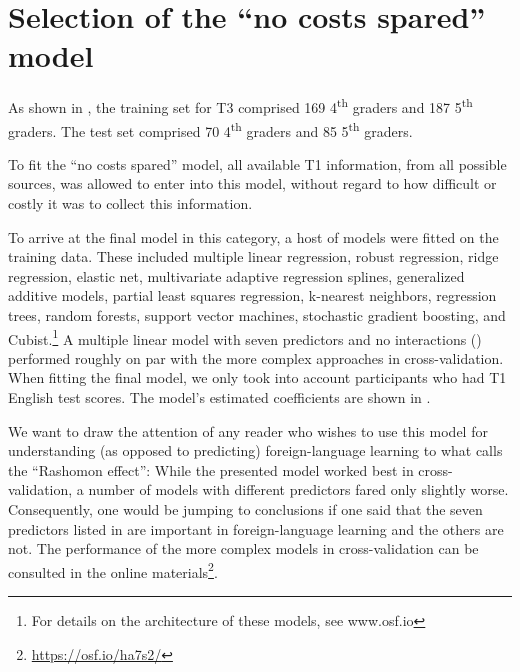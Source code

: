 \documentclass[output=paper]{langsci/langscibook}
\begin{document}
\section{Selection of the ``no costs spared'' model}

As shown in , the training set for T3 comprised 169 4\textsuperscript{th} graders and 187 5\textsuperscript{th} graders. The test set comprised 70 4\textsuperscript{th} graders and 85 5\textsuperscript{th} graders.

To fit the ``no costs spared'' model, all available T1 information, from all possible sources, was allowed to enter into this model, without regard to how difficult or costly it was to collect this information. 

To arrive at the final model in this category, a host of models were fitted on the training data. These included multiple linear regression, robust regression, ridge regression, elastic net, multivariate adaptive regression splines, generalized additive models, partial least squares regression, k-nearest neighbors, regression trees, random forests, support vector machines, stochastic gradient boosting, and Cubist.\footnote{For details on the architecture of these models, see www.osf.io} A multiple linear model with seven predictors and no interactions () performed roughly on par with the more complex approaches in cross-validation. When fitting the final model, we only took into account participants who had T1 English test scores. The model’s estimated coefficients are shown in . 

We want to draw the attention of any reader who wishes to use this model for understanding (as opposed to predicting) foreign-language learning to what \citet{Breiman2001} calls the ``Rashomon effect'': While the presented model worked best in cross-validation, a number of models with different predictors fared only slightly worse. Consequently, one would be jumping to conclusions if one said that the seven predictors listed in  are important in foreign-language learning and the others are not. The performance of the more complex models in cross-validation can be consulted in the online materials\footnote{\url{https://osf.io/ha7s2/}}.
\end{document}
